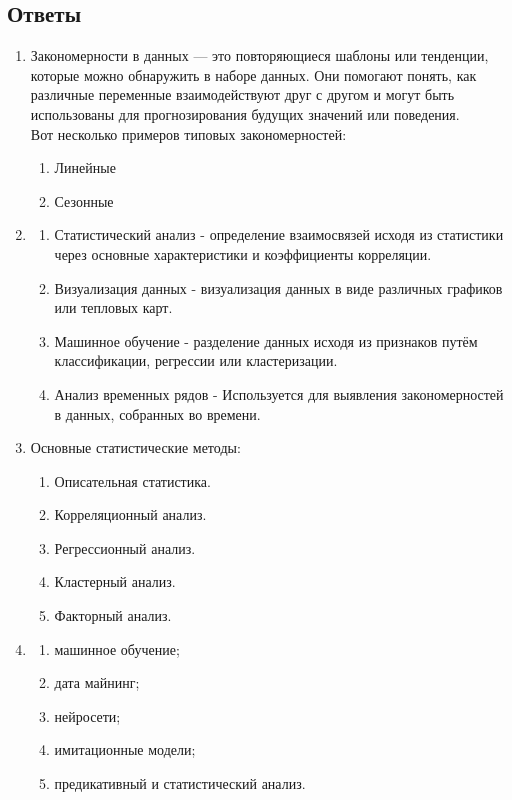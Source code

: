 \documentclass[a4paper, 12pt]{article}
\begin{document}
\subsection*{Ответы}
\begin{enumerate}
  \item Закономерности в данных — это повторяющиеся шаблоны или тенденции, которые можно обнаружить в наборе данных. Они помогают понять, как различные переменные взаимодействуют друг с другом и могут быть использованы для прогнозирования будущих значений или поведения.\\
  Вот несколько примеров типовых закономерностей:
  \begin{enumerate}
    \item Линейные
    \item Сезонные
  \end{enumerate}
  \item \begin{enumerate}
    \item Статистический анализ - определение взаимосвязей исходя из статистики через основные характеристики и коэффициенты корреляции.
    \item Визуализация данных - визуализация данных в виде различных графиков или тепловых карт.
    \item Машинное обучение - разделение данных исходя из признаков путём классификации, регрессии или кластеризации.
    \item Анализ временных рядов -  Используется для выявления закономерностей в данных, собранных во времени.
  \end{enumerate}
  \item Основные статистические методы:
  \begin{enumerate}
    \item Описательная статистика.
    \item Корреляционный анализ.
    \item Регрессионный анализ.
    \item Кластерный анализ.
    \item Факторный анализ.
  \end{enumerate}
  \item \begin{enumerate}
    \item машинное обучение;
    \item дата майнинг;
    \item нейросети;
    \item имитационные модели;
    \item предикативный и статистический анализ.

\end{enumerate}
\end{enumerate}
\end{document}
